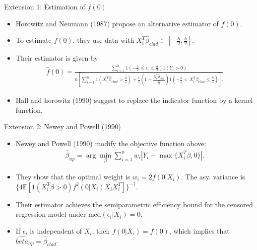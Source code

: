 \documentclass[xcolor=svgnames,dvipdfmx,cjk]{beamer}
\theoremstyle{example}
\def\med{\text{med}}
\def\E{\mathbb{E}}
\begin{document}
\begin{frame}{\alert{Extension 1}: Estimation of $f(0)$}
      \begin{itemize}
            \item Horowitz and Neumann (1987) propose an alternative estimator of $f(0)$.
            \item To estimate $f(0)$, they use data with 
                  $X_i^T \hat{\beta}_{clad} \in \left[ -\frac{h}{2}, \frac{h}{2} \right]$.
            \item Their estimator is given by 
                  \tiny{
                  \begin{align*}
                        \hat{f}(0) = \frac{
                              \sum_{i=1}^n 
                              1\left(-\frac{h}{2}\leq \hat{\epsilon}_i \leq \frac{h}{2}\right) 
                              1\left(Y_i > 0\right)
                        }{
                              h \left[
                                    \sum_{i=1}^n 
                                    1(X_i^T \hat{\beta}_{clad} > \frac{h}{2}) 
                                    + \frac{1}{2} \left( 1 + \frac{X_i^T \hat{\beta}_{clad}}{\frac{h}{2}}\right)
                                    1\left(-\frac{h}{2} < X_i^T \hat{\beta}_{clad} \leq \frac{h}{2}\right)
                              \right].
                        }
                  \end{align*}
                  }
            \item Hall and horowitz (1990) suggest to replace the indicator function 
                  by a kernel function.
      \end{itemize}
\end{frame}

\begin{frame}{\alert{Extension 2}: Newey and Powell (1990)}
      \begin{itemize}
            \item Newey and Powell (1990) modify the objective function above:
                  \begin{align*}
                        \hat{\beta}_{np} 
                              = \arg\min_{\beta} 
                                \sum_{i=1}^n
                                w_i |Y_i - \max\{X_i^T \beta, 0\}|.
                  \end{align*}
            \item They show that the optimal weight is 
                  $w_i = 2 f(0|X_i)$.
                  The asy. variance is $\{ 4\E[1(X_i^T\beta>0) f^2(0|X_i)X_iX_i^T] \}^{-1}$.
            \item Their estimator achieves \alert{the semiparametric efficiency bound} 
                  for the censored regression model under $\med(\epsilon_i|X_i)=0$.
            \item If $\epsilon_i$ is independent of $X_i$, then $f(0|X_i) = f(0)$, 
                  which implies that $\hat{beta}_{np} = \hat{\beta}_{clad}$.
      \end{itemize}      
\end{frame}
\end{document}
